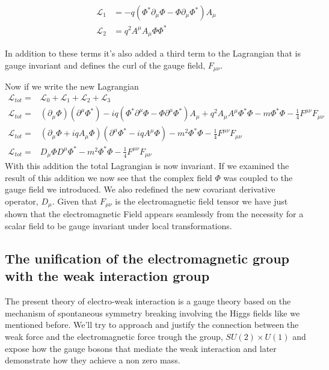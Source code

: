 \documentclass[11pt,twoside,a4paper]{article}
\begin{document}
\begin{align}
\mathcal{L}_1 & =  -q \left( \Phi^* \partial_\mu \Phi  - \Phi \partial_\mu \Phi^* \right) A_\mu \\
\mathcal{L}_2 & =  q^2  A^\mu A_\mu \Phi \Phi^* 
\end{align}

 In addition to these terms it's also added a third term to the Lagrangian that is gauge invariant and defines the curl of the gauge field, $F_{\mu \nu}$. 

  Now if we write the new Lagrangian 
 \begin{align} 
  \mathcal{L}_{tot}= & \mathcal{L}_0+\mathcal{L}_1+\mathcal{L}_2+\mathcal{L}_3 \\
  \mathcal{L}_{tot}= & (\partial_\mu \Phi)(\partial^\mu \Phi^*) - iq(\Phi^* \partial^\mu \Phi - \Phi \partial^\mu \Phi^* )A_\mu + q^2 A_\mu A^\mu \Phi^* \Phi - m \Phi^* \Phi - \frac{1}{4} F^{\mu \nu} F_{\mu \nu} \\ 
  \mathcal{L}_{tot}= & (\partial_\mu \Phi + iq A_\mu \Phi)(\partial^\mu \Phi^* - iq A^\mu \Phi)- m^2 \Phi^* \Phi  - \frac{1}{4} F^{\mu \nu} F_{\mu \nu} \\
  \mathcal{L}_{tot}= & D_\mu \Phi D^\mu \Phi^*  - m^2 \Phi^* \Phi  - \frac{1}{4} F^{\mu \nu} F_{\mu \nu}
 \end{align}
 With this addition the total Lagrangian is now invariant. If we examined the result of this addition we now see that the complex field $\Phi$ was coupled to the gauge field we introduced. We also redefined the new covariant derivative operator, $D_\mu$. Given that $F_{\mu \nu}$ is the electromagnetic field tensor we have just shown that the electromagnetic Field appears seamlessly from the necessity for a scalar  field to be gauge invariant under local transformations. 

\subsection{The unification of the electromagnetic group with the weak interaction group}

The present theory  of electro-weak interaction is a gauge theory based on the mechanism of spontaneous symmetry breaking involving the Higgs fields like we mentioned before. We'll try to approach and justify the connection between the weak force and the electromagnetic force trough the group, $SU(2) \times U(1)$ and expose how the gauge bosons that mediate the weak interaction and later demonstrate how they achieve a non zero mass.
\end{document}
